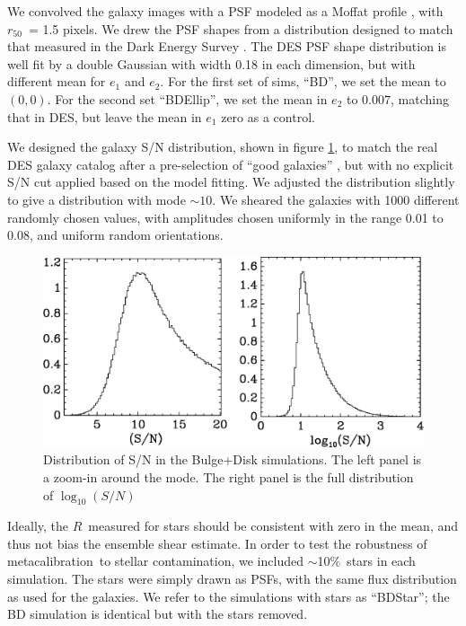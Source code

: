 \documentclass[usegraphicx,usenatbib]{mn2e}
\newcommand{\hlr}{$r_{50}$}
\newcommand{\mcal}{metacalibration}
\newcommand{\mcalR}{$R$}
\newcommand{\nsimNstarperc}{10\%}
\begin{document}
We convolved the galaxy images with a PSF modeled as a Moffat profile
\citep{Moffat1969}, with \hlr\ = 1.5 pixels.  We drew the PSF shapes from a
distribution designed to match that measured in the Dark Energy Survey
\citep[][(DES)]{DESSVShear}.  The DES PSF shape distribution is well fit by a
double Gaussian with width 0.18 in each dimension, but with different mean for
$e_1$ and $e_2$.  For the first set of sims, ``BD'', we set the mean to
$(0,0)$.  For the second set ``BDEllip'', we set the mean in $e_2$ to $0.007$,
matching that in DES, but leave the mean in $e_1$ zero as a control.

We designed the galaxy S/N distribution, shown in figure \ref{fig:s2n}, to
match the real DES galaxy catalog after a pre-selection of ``good galaxies''
\citep{DESSVShear}, but with no explicit S/N cut applied based on the model
fitting.  We adjusted the distribution slightly to give a distribution with
mode $\sim10$.  We sheared the galaxies with 1000 different randomly chosen values,
with amplitudes chosen uniformly in the range 0.01 to 0.08, and uniform random
orientations.

\begin{figure}
    \centering
    \includegraphics[scale=0.45]{s2n-bd16.eps}

    \caption{Distribution of S/N in the Bulge+Disk simulations. The
    left panel is a zoom-in around the mode.  The right panel is
the full distribution of $\log_{10}(S/N)$}

\label{fig:s2n}
\end{figure}


Ideally, the \mcalR\ measured for stars should be consistent with zero in the
mean, and thus not bias the ensemble shear estimate.  In order to test the
robustness of \mcal\ to stellar contamination, we included $\sim$\nsimNstarperc\ stars
in each simulation.  The stars were simply drawn as PSFs, with the same flux
distribution as used for the galaxies.  We refer to the simulations with
stars as ``BDStar''; the BD simulation is identical but with the stars
removed.
\end{document}
